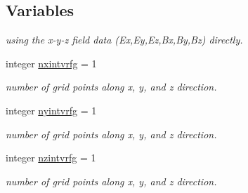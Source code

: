 \subsection*{Variables}
\textbf{ }\par
{\em using the x-\/y-\/z field data (Ex,Ey,Ez,Bx,By,Bz) directly. }\begin{DoxyCompactItemize}
\item 
integer \mbox{\hyperlink{namespacedataclass_a6302bc97206196f7003db67abd75507e}{nxintvrfg}} = 1
\begin{DoxyCompactList}\small\item\em number of grid points along x, y, and z direction. \end{DoxyCompactList}\item 
integer \mbox{\hyperlink{namespacedataclass_a32c01f4c7d58343edc8d318b2e5f4760}{nyintvrfg}} = 1
\begin{DoxyCompactList}\small\item\em number of grid points along x, y, and z direction. \end{DoxyCompactList}\item 
integer \mbox{\hyperlink{namespacedataclass_a53f757bd562f34f7e8e6bb58606fc289}{nzintvrfg}} = 1
\begin{DoxyCompactList}\small\item\em number of grid points along x, y, and z direction. \end{DoxyCompactList}\end{DoxyCompactItemize}

